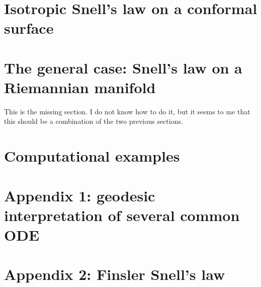 \section{Isotropic Snell's law on a conformal surface}

\section{The general case: Snell's law on a Riemannian manifold}

This is the missing section.  I do not know how to do it, but it seems to me
that this should be a combination of the two previous sections.

\section{Computational examples}

\section{Appendix 1: geodesic interpretation of several common ODE}

\section{Appendix 2: Finsler Snell's law}


